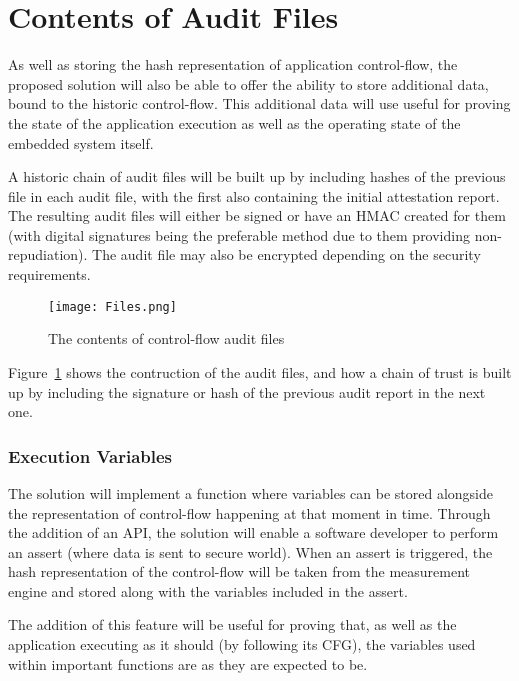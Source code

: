\section{Contents of Audit Files}

As well as storing the hash representation of application control-flow, the proposed solution will also be able to offer the ability to store additional data, bound to the historic control-flow. This additional data will use useful for proving the state of the application execution as well as the operating state of the embedded system itself.

A historic chain of audit files will be built up by including hashes of the previous file in each audit file, with the first also containing the initial attestation report. The resulting audit files will either be signed or have an HMAC created for them (with digital signatures being the preferable method due to them providing non-repudiation). The audit file may also be encrypted depending on the security requirements. 

\begin{figure}
  \centering
  \vspace*{0.5in}
  \texttt{[image: Files.png]}
  \caption{The contents of control-flow audit files}
  \label{fig:auditFiles}
\end{figure}

Figure~\ref{fig:auditFiles} shows the contruction of the audit files, and how a chain of trust is built up by including the signature or hash of the previous audit report in the next one.

\subsubsection*{Execution Variables}

The solution will implement a function where variables can be stored alongside the representation of control-flow happening at that moment in time. Through the addition of an API, the solution will enable a software developer to perform an assert (where data is sent to secure world). When an assert is triggered, the hash representation of the control-flow will be taken from the measurement engine and stored along with the variables included in the assert.

The addition of this feature will be useful for proving that, as well as the application executing as it should (by following its CFG), the variables used within important functions are as they are expected to be.

